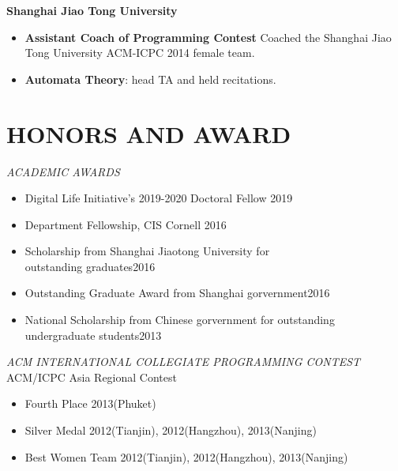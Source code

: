 \documentclass[margin, 10pt]{res} %
\begin{document}
\begin{resume}
\textbf{Shanghai Jiao Tong University}
\begin{itemize}
\item \textbf{Assistant Coach of Programming Contest} Coached the Shanghai Jiao Tong University ACM-ICPC 2014 female team.
\item \textbf{Automata Theory}: head TA and held recitations.
\end{itemize}




\section{HONORS AND AWARD}

{\sl ACADEMIC AWARDS}\\
\begin{itemize}
\item Digital Life Initiative's 2019-2020 Doctoral Fellow \hfill 2019
\item Department Fellowship, CIS Cornell \hfill 2016
\item Scholarship from Shanghai Jiaotong University for\\ outstanding graduates\hfill 2016
\item Outstanding Graduate Award from Shanghai gorvernment\hfill 2016
\item National Scholarship from Chinese gorvernment for outstanding\\ undergraduate students\hfill 2013 
\end{itemize}



{\sl ACM INTERNATIONAL COLLEGIATE PROGRAMMING CONTEST} \\
ACM/ICPC Asia Regional Contest 

\begin{itemize} \itemsep -2pt %
\item Fourth Place \hfill 2013(Phuket)
\item Silver Medal \hfill 2012(Tianjin), 2012(Hangzhou), 2013(Nanjing) 
\item Best Women Team \hfill 2012(Tianjin), 2012(Hangzhou), 2013(Nanjing) 
\end{itemize}
 
\end{resume}
\end{document}
